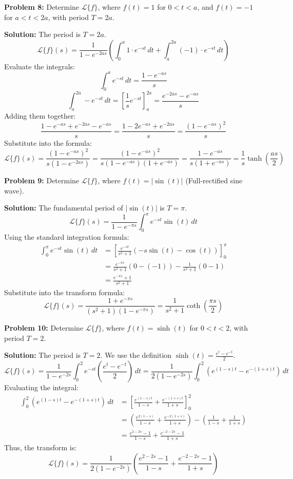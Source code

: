 \documentclass[11pt, letterpaper]{article}
\theoremstyle{definition}
\theoremstyle{remark}
\begin{document}
\vspace{1em}
\textbf{Problem 8:} Determine $\mathcal{L}\{f\}$, where $f(t) = 1$ for $0 < t < a$, and $f(t) = -1$ for $a < t < 2a$, with period $T = 2a$.

\textbf{Solution:}
The period is $T = 2a$.
\[ \mathcal{L}\{f\}(s) = \frac{1}{1 - e^{-2as}} \left( \int_0^a 1 \cdot e^{-st} \,dt + \int_a^{2a} (-1) \cdot e^{-st} \,dt \right) \]
Evaluate the integrals:
\[ \int_0^a e^{-st} \,dt = \frac{1 - e^{-as}}{s} \]
\[ \int_a^{2a} -e^{-st} \,dt = \left[ \frac{1}{s} e^{-st} \right]_a^{2a} = \frac{e^{-2as} - e^{-as}}{s} \]
Adding them together:
\[ \frac{1 - e^{-as} + e^{-2as} - e^{-as}}{s} = \frac{1 - 2e^{-as} + e^{-2as}}{s} = \frac{(1 - e^{-as})^2}{s} \]
Substitute into the formula:
\[ \mathcal{L}\{f\}(s) = \frac{(1 - e^{-as})^2}{s(1 - e^{-2as})} = \frac{(1 - e^{-as})^2}{s(1 - e^{-as})(1 + e^{-as})} = \frac{1 - e^{-as}}{s(1 + e^{-as})} = \frac{1}{s} \tanh\left(\frac{as}{2}\right) \]

\vspace{1em}
\textbf{Problem 9:} Determine $\mathcal{L}\{f\}$, where $f(t) = |\sin(t)|$ (Full-rectified sine wave).

\textbf{Solution:}
The fundamental period of $|\sin(t)|$ is $T = \pi$.
\[ \mathcal{L}\{f\}(s) = \frac{1}{1 - e^{-\pi s}} \int_0^\pi e^{-st} \sin(t) \,dt \]
Using the standard integration formula:
\begin{align*}
\int_0^\pi e^{-st} \sin(t) \,dt &= \left[ \frac{e^{-st}}{s^2 + 1} (-s \sin(t) - \cos(t)) \right]_0^\pi \\
&= \frac{e^{-\pi s}}{s^2 + 1} (0 - (-1)) - \frac{1}{s^2 + 1} (0 - 1) \\
&= \frac{e^{-\pi s} + 1}{s^2 + 1}
\end{align*}
Substitute into the transform formula:
\[ \mathcal{L}\{f\}(s) = \frac{1 + e^{-\pi s}}{(s^2 + 1)(1 - e^{-\pi s})} = \frac{1}{s^2 + 1} \coth\left(\frac{\pi s}{2}\right) \]

\vspace{1em}
\textbf{Problem 10:} Determine $\mathcal{L}\{f\}$, where $f(t) = \sinh(t)$ for $0 < t < 2$, with period $T = 2$.

\textbf{Solution:}
The period is $T = 2$. We use the definition $\sinh(t) = \frac{e^t - e^{-t}}{2}$.
\[ \mathcal{L}\{f\}(s) = \frac{1}{1 - e^{-2s}} \int_0^2 e^{-st} \left( \frac{e^t - e^{-t}}{2} \right) \,dt = \frac{1}{2(1 - e^{-2s})} \int_0^2 \left( e^{(1-s)t} - e^{-(1+s)t} \right) \,dt \]
Evaluating the integral:
\begin{align*}
\int_0^2 \left( e^{(1-s)t} - e^{-(1+s)t} \right) \,dt &= \left[ \frac{e^{(1-s)t}}{1-s} + \frac{e^{-(1+s)t}}{1+s} \right]_0^2 \\
&= \left( \frac{e^{2(1-s)}}{1-s} + \frac{e^{-2(1+s)}}{1+s} \right) - \left( \frac{1}{1-s} + \frac{1}{1+s} \right) \\
&= \frac{e^{2-2s} - 1}{1-s} + \frac{e^{-2-2s} - 1}{1+s}
\end{align*}
Thus, the transform is:
\[ \mathcal{L}\{f\}(s) = \frac{1}{2(1 - e^{-2s})} \left( \frac{e^{2-2s} - 1}{1-s} + \frac{e^{-2-2s} - 1}{1+s} \right) \]
\end{document}
